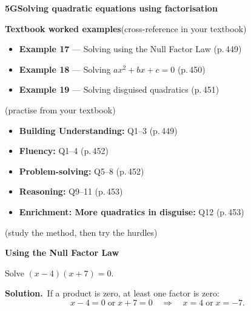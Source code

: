 \documentclass[11pt]{article}
\newcommand{\sectionband}[3]{\needspace{5\baselineskip}\vspace{6pt}
  \begin{tcolorbox}[enhanced,colback=chalk,colframe=chalk,boxrule=0pt,left=12pt,right=12pt,top=8pt,bottom=8pt,arc=4pt,
      overlay={\node[anchor=east,text=white,opacity=0.9] at ([xshift=-12pt]frame.east) {\small\textsf{#3}};}]
    {\color{white}\large\bfseries\textsf{#1}\quad #2}\end{tcolorbox}}
\begin{document}
\sectionband{5G}{Solving quadratic equations using factorisation}{CORE}

\begin{refbox}
{\bfseries\color{chalkdk}Textbook worked examples}\;\textcolor{inksoft}{\small(cross-reference in your textbook)}\\[3pt]
\begin{itemize}[leftmargin=16pt,itemsep=1pt,topsep=2pt]
  \item \textbf{Example 17} --- Solving using the Null Factor Law \textcolor{inksoft}{(p.\,449)}
  \item \textbf{Example 18} --- Solving $ax^2+bx+c=0$ \textcolor{inksoft}{(p.\,450)}
  \item \textbf{Example 19} --- Solving disguised quadratics \textcolor{inksoft}{(p.\,451)}
\end{itemize}
\;\textcolor{inksoft}{\small(practise from your textbook)}\\[3pt]
\begin{itemize}[leftmargin=16pt,itemsep=1pt,topsep=2pt]
  \item \textbf{Building Understanding:} Q1--3 \textcolor{inksoft}{(p.\,449)}
  \item \textbf{Fluency:} Q1--4 \textcolor{inksoft}{(p.\,452)}
  \item \textbf{Problem-solving:} Q5--8 \textcolor{inksoft}{(p.\,452)}
  \item \textbf{Reasoning:} Q9--11 \textcolor{inksoft}{(p.\,453)}
  \item \textbf{Enrichment: More quadratics in disguise:} Q12 \textcolor{inksoft}{(p.\,453)}
\end{itemize}\end{refbox}

\;\textcolor{inksoft}{\small(study the method, then try the hurdles)}\par

\begin{workedbox}

{\bfseries\color{chalkdk}Using the Null Factor Law}\par\vspace{3pt}

Solve $(x-4)(x+7)=0$.\par\vspace{2pt}

{\bfseries Solution.}\ If a product is zero, at least one factor is zero: \[x-4=0 \;\text{or}\; x+7=0 \quad\Rightarrow\quad x=4 \;\text{or}\; x=-7.\]

\end{workedbox}
\end{document}
